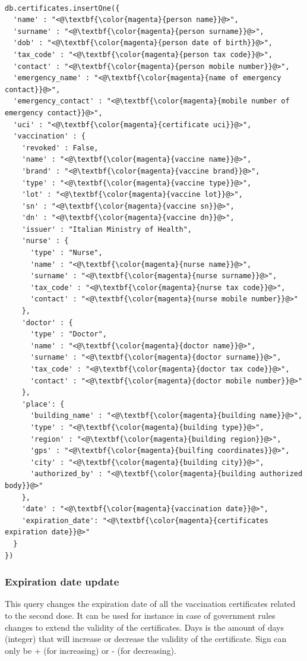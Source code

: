 \documentclass{article}
\begin{document}
\begin{lstlisting}[language=cypher, label=lst:cypher-example]

db.certificates.insertOne({
  'name' : "<@\textbf{\color{magenta}{person name}}@>",
  'surname' : "<@\textbf{\color{magenta}{person surname}}@>",
  'dob' : "<@\textbf{\color{magenta}{person date of birth}}@>",
  'tax_code' : "<@\textbf{\color{magenta}{person tax code}}@>",
  'contact' : "<@\textbf{\color{magenta}{person mobile number}}@>",
  'emergency_name' : "<@\textbf{\color{magenta}{name of emergency contact}}@>",
  'emergency_contact' : "<@\textbf{\color{magenta}{mobile number of emergency contact}}@>",
  'uci' : "<@\textbf{\color{magenta}{certificate uci}}@>",
  'vaccination' : {
    'revoked' : False,
    'name' : "<@\textbf{\color{magenta}{vaccine name}}@>",
    'brand' : "<@\textbf{\color{magenta}{vaccine brand}}@>",
    'type' : "<@\textbf{\color{magenta}{vaccine type}}@>",
    'lot' : "<@\textbf{\color{magenta}{vaccine lot}}@>",
    'sn' : "<@\textbf{\color{magenta}{vaccine sn}}@>",
    'dn' : "<@\textbf{\color{magenta}{vaccine dn}}@>",
    'issuer' : "Italian Ministry of Health",
    'nurse' : {
      'type' : "Nurse",
      'name' : "<@\textbf{\color{magenta}{nurse name}}@>",
      'surname' : "<@\textbf{\color{magenta}{nurse surname}}@>",
      'tax_code' : "<@\textbf{\color{magenta}{nurse tax code}}@>",
      'contact' : "<@\textbf{\color{magenta}{nurse mobile number}}@>"
    },
    'doctor' : {
      'type' : "Doctor",
      'name' : "<@\textbf{\color{magenta}{doctor name}}@>",
      'surname' : "<@\textbf{\color{magenta}{doctor surname}}@>",
      'tax_code' : "<@\textbf{\color{magenta}{doctor tax code}}@>",
      'contact' : "<@\textbf{\color{magenta}{doctor mobile number}}@>"
    },
    'place': {
      'building_name' : "<@\textbf{\color{magenta}{building name}}@>",
      'type' : "<@\textbf{\color{magenta}{building type}}@>",
      'region' : "<@\textbf{\color{magenta}{building region}}@>",
      'gps' : "<@\textbf{\color{magenta}{builfing coordinates}}@>",
      'city' : "<@\textbf{\color{magenta}{building city}}@>",
      'authorized_by' : "<@\textbf{\color{magenta}{building authorized body}}@>"
    },
    'date' : "<@\textbf{\color{magenta}{vaccination date}}@>",
    'expiration_date': "<@\textbf{\color{magenta}{certificates expiration date}}@>"
  }
})

\end{lstlisting}
\subsubsection{Expiration date update}
This query changes the expiration date of all the vaccination certificates related to the second dose. It can be used for instance in case of government rules changes to extend the validity of the certificates.
Days is the amount of days (integer) that will increase or decrease the validity of the certificate. Sign can only be + (for increasing) or - (for decreasing).
\end{document}
